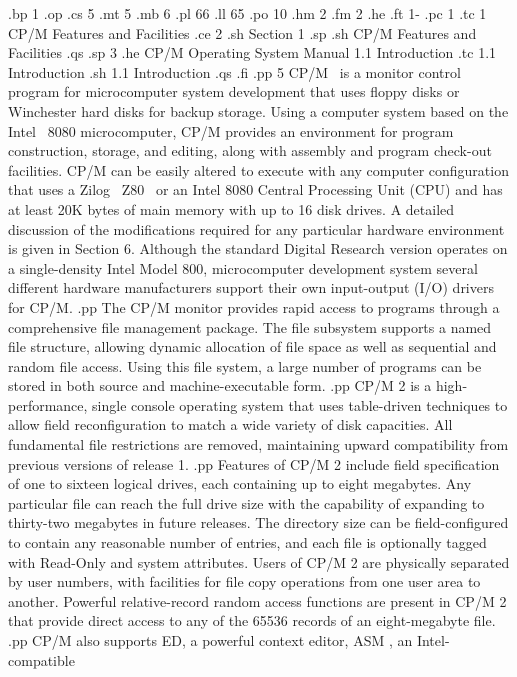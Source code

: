 .bp 1
.op
.cs 5
.mt 5
.mb 6
.pl 66
.ll 65
.po 10
.hm 2
.fm 2
.he
.ft                                1-%
.pc 1
.tc 1  CP/M Features and Facilities
.ce 2
.sh
Section 1
.sp
.sh
CP/M Features and Facilities
.qs
.sp 3
.he CP/M Operating System Manual                    1.1  Introduction
.tc    1.1  Introduction
.sh
1.1  Introduction
.qs
.fi
.pp 5
CP/M \ is a monitor control program for microcomputer system development that
uses floppy disks or Winchester hard disks for backup storage.  Using a
computer system based on the Intel \ 8080 microcomputer, CP/M provides an
environment for program construction, storage, and editing, along
with assembly and program check-out facilities.  CP/M can be easily
altered to execute with any computer
configuration that uses a Zilog \ Z80 \ or an Intel 8080 Central Processing
Unit (CPU) and has at least 20K bytes of main memory with up to 16 disk
drives.  A detailed discussion of the modifications required for any
particular hardware environment is given in Section 6.  Although the
standard Digital Research version operates on a single-density 
Intel Model 800, microcomputer development system several different 
hardware manufacturers support their own input-output (I/O) drivers for CP/M.
.pp
The CP/M monitor provides rapid access to programs through a comprehensive
file management package.  The file subsystem supports a named file structure,
allowing dynamic allocation of file space as well as sequential and random
file access.  Using this file system, a large number of programs can be
stored in both source and machine-executable form.
.pp
CP/M 2 is a high-performance, single console operating system that uses
table-driven techniques to allow field reconfiguration to match a wide
variety of disk capacities.  All fundamental file restrictions are removed,
maintaining upward compatibility from previous versions of release 1.
.pp
Features of CP/M 2 include field specification of one to sixteen logical
drives, each containing up to eight megabytes.  Any particular file can
reach the full drive size with the capability of expanding to thirty-two
megabytes in future releases.  The directory size can be field-configured to
contain any reasonable number of entries, and each file is optionally tagged
with Read-Only and system attributes.  Users of CP/M 2 are physically
separated by user numbers, with facilities for file copy operations from one
user area to another.  Powerful relative-record random access functions are
present in CP/M 2 that provide direct access to any of the 65536 records of
an eight-megabyte file.
.pp
CP/M also supports ED, a powerful context editor, ASM , an Intel-compatible
